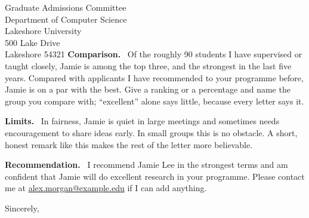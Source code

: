 \documentclass[paper=a4,fontsize=11pt,parskip=half,subject=underlined,
               fromrule=off,fromalign=left,backaddress=false,foldmarks=false,enlargefirstpage=true]{scrlttr2}
\newcommand*{\topic}[1]{\textbf{#1.}\ }
\begin{document}
\begin{letter}{Graduate Admissions Committee\\
               Department of Computer Science\\
               Lakeshore University\\
               500 Lake Drive\\
               Lakeshore 54321}
\topic{Comparison} Of the roughly 90 students I have supervised or taught closely, Jamie
is among the top three, and the strongest in the last five years. Compared with
applicants I have recommended to your programme before, Jamie is on a par with the best.
Give a ranking or a percentage and name the group you compare with; ``excellent'' alone
says little, because every letter says it.

\topic{Limits} In fairness, Jamie is quiet in large meetings and sometimes needs
encouragement to share ideas early. In small groups this is no obstacle. A short, honest
remark like this makes the rest of the letter more believable.

\topic{Recommendation} I recommend Jamie Lee in the strongest terms and am confident that
Jamie will do excellent research in your programme. Please contact me at
\href{mailto:alex.morgan@example.edu}{alex.morgan@example.edu} if I can add anything.

\closing{Sincerely,}


\end{letter}
\end{document}
